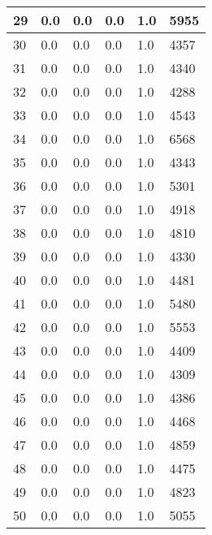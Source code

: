 \begin{longtable}{|l|l|l|l|l|l|}
29 & 0.0 & 0.0 & 0.0 & 1.0 & 5955 \\ \hline 
30 & 0.0 & 0.0 & 0.0 & 1.0 & 4357 \\ \hline 
31 & 0.0 & 0.0 & 0.0 & 1.0 & 4340 \\ \hline 
32 & 0.0 & 0.0 & 0.0 & 1.0 & 4288 \\ \hline 
33 & 0.0 & 0.0 & 0.0 & 1.0 & 4543 \\ \hline 
34 & 0.0 & 0.0 & 0.0 & 1.0 & 6568 \\ \hline 
35 & 0.0 & 0.0 & 0.0 & 1.0 & 4343 \\ \hline 
36 & 0.0 & 0.0 & 0.0 & 1.0 & 5301 \\ \hline 
37 & 0.0 & 0.0 & 0.0 & 1.0 & 4918 \\ \hline 
38 & 0.0 & 0.0 & 0.0 & 1.0 & 4810 \\ \hline 
39 & 0.0 & 0.0 & 0.0 & 1.0 & 4330 \\ \hline 
40 & 0.0 & 0.0 & 0.0 & 1.0 & 4481 \\ \hline 
41 & 0.0 & 0.0 & 0.0 & 1.0 & 5480 \\ \hline 
42 & 0.0 & 0.0 & 0.0 & 1.0 & 5553 \\ \hline 
43 & 0.0 & 0.0 & 0.0 & 1.0 & 4409 \\ \hline 
44 & 0.0 & 0.0 & 0.0 & 1.0 & 4309 \\ \hline 
45 & 0.0 & 0.0 & 0.0 & 1.0 & 4386 \\ \hline 
46 & 0.0 & 0.0 & 0.0 & 1.0 & 4468 \\ \hline 
47 & 0.0 & 0.0 & 0.0 & 1.0 & 4859 \\ \hline 
48 & 0.0 & 0.0 & 0.0 & 1.0 & 4475 \\ \hline 
49 & 0.0 & 0.0 & 0.0 & 1.0 & 4823 \\ \hline 
50 & 0.0 & 0.0 & 0.0 & 1.0 & 5055 \\ \hline 
\end{longtable}